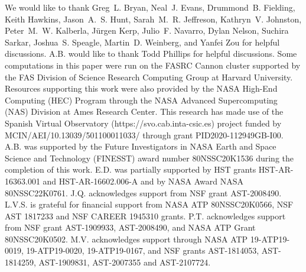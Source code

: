 \documentclass[twocolumn,linenumbers,trackchanges]{aastex631}
\begin{document}
\begin{acknowledgments}
  We would like to thank Greg~L. Bryan, Neal~J. Evans, Drummond~B. Fielding,
  Keith Hawkins, Jason~A.~S. Hunt, Sarah~M.~R. Jeffreson, Kathryn~V. Johnston,
  Peter~M.~W. Kalberla, Jürgen Kerp, Julio~F. Navarro, Dylan Nelson, Suchira
  Sarkar, Joshua~S. Speagle, Martin~D. Weinberg, and Yanfei Zou for helpful
  discussions. A.B. would like to thank Todd Phillips for helpful discussions.
  Some computations in this paper were run on the FASRC Cannon cluster supported
  by the FAS Division of Science Research Computing Group at Harvard University.
  Resources supporting this work were also provided by the NASA High-End
  Computing (HEC) Program through the NASA Advanced Supercomputing (NAS)
  Division at Ames Research Center. This research has made use of the Spanish
  Virtual Observatory (https://svo.cab.inta-csic.es) project funded by
  MCIN/AEI/10.13039/501100011033/ through grant PID2020-112949GB-I00. A.B. was
  supported by the Future Investigators in NASA Earth and Space Science and
  Technology (FINESST) award number 80NSSC20K1536 during the completion of this
  work. E.D. was partially supported by HST grants HST-AR-16363.001 and
  HST-AR-16602.006-A and by NASA Award NASA 80NSSC22K0761. J.Q. acknowledges
  support from NSF grant AST-2008490. L.V.S. is grateful for financial support
  from NASA ATP 80NSSC20K0566, NSF AST 1817233 and NSF CAREER 1945310 grants.
  P.T. acknowledges support from NSF grant AST-1909933, AST-2008490, and NASA
  ATP Grant 80NSSC20K0502. M.V. acknowledges support through NASA ATP
  19-ATP19-0019, 19-ATP19-0020, 19-ATP19-0167, and NSF grants AST-1814053,
  AST-1814259, AST-1909831, AST-2007355 and AST-2107724.
\end{acknowledgments}


\appendix
\end{document}
